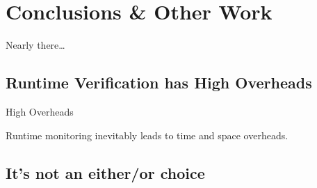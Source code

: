 \documentclass[12pt]{beamer}
\begin{document}

\section{Conclusions \& Other Work}
\label{sec:conc}

\begin{frame}
  \begin{center}
    \Large Nearly there\ldots
  \end{center}
\end{frame}

\subsection{Runtime Verification has High Overheads}
\label{sec:conc-over}

\begin{frame}{High Overheads}

  Runtime monitoring inevitably leads to time and space overheads.

\end{frame}

\subsection{It's not an either/or choice}
\label{sec:conc-dich}
\end{document}
